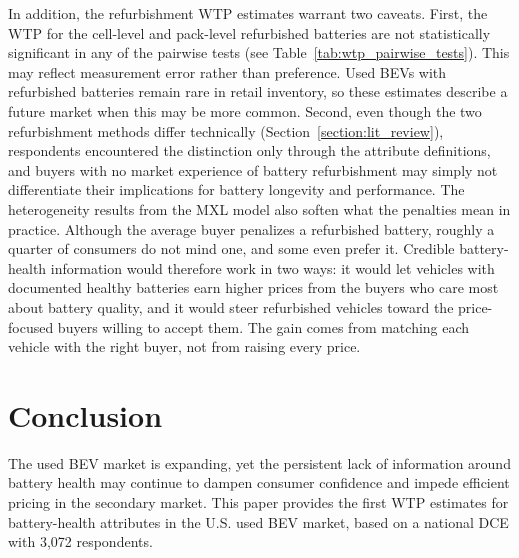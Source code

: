 \documentclass[a4paper,fleqn]{cas-sc}   %
\begin{document}
In addition, the refurbishment WTP estimates warrant two caveats. First, the WTP for the cell-level and pack-level refurbished batteries are not statistically significant in any of the pairwise tests (see Table~\ref{tab:wtp_pairwise_tests}). This may reflect measurement error rather than preference. Used BEVs with refurbished batteries remain rare in retail inventory, so these estimates describe a future market when this may be more common. Second, even though the two refurbishment methods differ technically (Section~\ref{section:lit_review}), respondents encountered the distinction only through the attribute definitions, and buyers with no market experience of battery refurbishment may simply not differentiate their implications for battery longevity and performance. The heterogeneity results from the MXL model also soften what the penalties mean in practice. Although the average buyer penalizes a refurbished battery, roughly a quarter of consumers do not mind one, and some even prefer it. Credible battery-health information would therefore work in two ways: it would let vehicles with documented healthy batteries earn higher prices from the buyers who care most about battery quality, and it would steer refurbished vehicles toward the price-focused buyers willing to accept them. The gain comes from matching each vehicle with the right buyer, not from raising every price.

\section{Conclusion}
\label{section:conclusion}

The used BEV market is expanding, yet the persistent lack of information around battery health may continue to dampen consumer confidence and impede efficient pricing in the secondary market. This paper provides the first WTP estimates for battery-health attributes in the U.S. used BEV market, based on a national DCE with 3,072 respondents.
\end{document}
